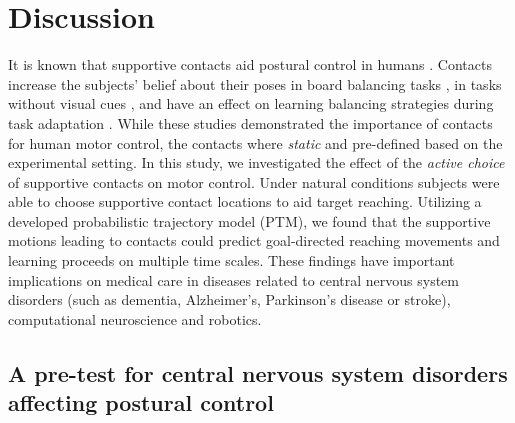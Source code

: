 

\section*{Discussion}

It is known that supportive contacts aid postural control in humans 
\cite{balasubramaniam2002dynamics}. Contacts increase the subjects' belief about 
their poses in board balancing tasks \cite{slijper2000effects}, in tasks without 
visual cues \cite{johannsen2007effects}, and have an effect on learning 
balancing strategies during task adaptation \cite{babivc2014effects}. While 
these studies demonstrated the importance of contacts for human motor control, 
the contacts where \textit{static} and pre-defined based on the experimental 
setting. In this study, we investigated the effect of the \textit{active choice} 
of supportive contacts on motor control. Under natural conditions subjects were 
able to choose supportive contact locations to aid target reaching. Utilizing a 
developed probabilistic trajectory model (PTM), we found that the supportive motions 
leading to contacts could predict goal-directed reaching movements and 
learning proceeds on multiple time scales. These findings have important 
implications on medical care in diseases related to central nervous system 
disorders (such as dementia, Alzheimer's, Parkinson's disease or stroke), 
computational neuroscience and robotics. 

\subsection*{A pre-test for central nervous system disorders affecting postural control} 

